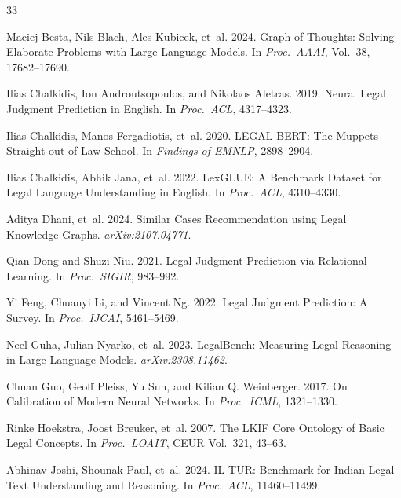 \documentclass[11pt]{article}
\begin{document}
\begin{thebibliography}{33}

Maciej Besta, Nils Blach, Ales Kubicek, et~al. 2024. Graph of Thoughts: Solving Elaborate Problems with Large Language Models. In \emph{Proc.\ AAAI}, Vol.~38, 17682--17690.

Ilias Chalkidis, Ion Androutsopoulos, and Nikolaos Aletras. 2019. Neural Legal Judgment Prediction in English. In \emph{Proc.\ ACL}, 4317--4323.

Ilias Chalkidis, Manos Fergadiotis, et~al. 2020. LEGAL-BERT: The Muppets Straight out of Law School. In \emph{Findings of EMNLP}, 2898--2904.

Ilias Chalkidis, Abhik Jana, et~al. 2022. LexGLUE: A Benchmark Dataset for Legal Language Understanding in English. In \emph{Proc.\ ACL}, 4310--4330.

Aditya Dhani, et~al. 2024. Similar Cases Recommendation using Legal Knowledge Graphs. \emph{arXiv:2107.04771}.

Qian Dong and Shuzi Niu. 2021. Legal Judgment Prediction via Relational Learning. In \emph{Proc.\ SIGIR}, 983--992.

Yi Feng, Chuanyi Li, and Vincent Ng. 2022. Legal Judgment Prediction: A Survey. In \emph{Proc.\ IJCAI}, 5461--5469.

Neel Guha, Julian Nyarko, et~al. 2023. LegalBench: Measuring Legal Reasoning in Large Language Models. \emph{arXiv:2308.11462}.

Chuan Guo, Geoff Pleiss, Yu Sun, and Kilian Q. Weinberger. 2017. On Calibration of Modern Neural Networks. In \emph{Proc.\ ICML}, 1321--1330.

Rinke Hoekstra, Joost Breuker, et~al. 2007. The LKIF Core Ontology of Basic Legal Concepts. In \emph{Proc.\ LOAIT}, CEUR Vol.~321, 43--63.

Abhinav Joshi, Shounak Paul, et~al. 2024. IL-TUR: Benchmark for Indian Legal Text Understanding and Reasoning. In \emph{Proc.\ ACL}, 11460--11499.


\end{thebibliography}
\end{document}
